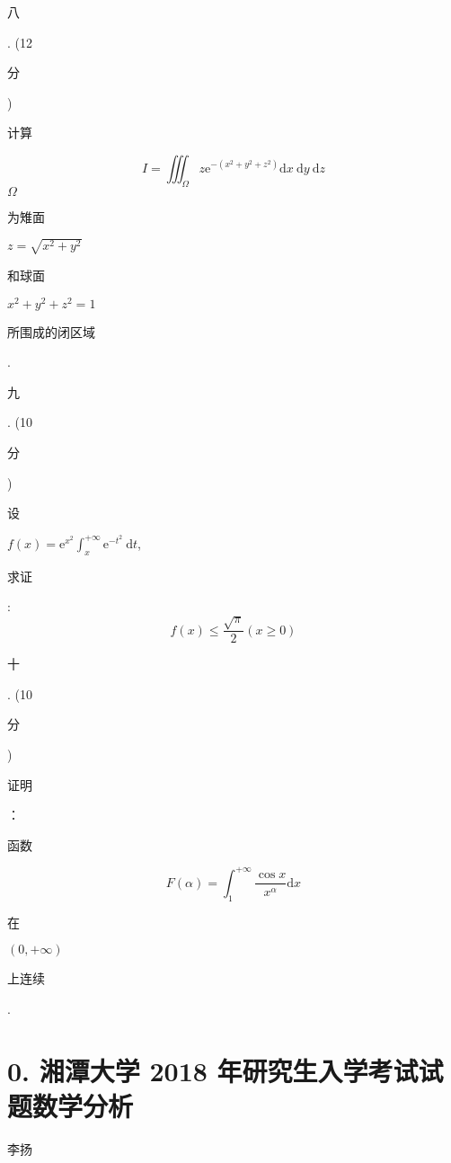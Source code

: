 \documentclass[10pt]{article}
\begin{document}
\begin{CJK}{UTF8}{mj}八\end{CJK}. (12 \begin{CJK}{UTF8}{mj}分\end{CJK}) \begin{CJK}{UTF8}{mj}计算\end{CJK}
$$
I=\iiint_{\Omega} z \mathrm{e}^{-\left(x^{2}+y^{2}+z^{2}\right)} \mathrm{d} x \mathrm{~d} y \mathrm{~d} z
$$
$\Omega$ \begin{CJK}{UTF8}{mj}为雉面\end{CJK} $z=\sqrt{x^{2}+y^{2}}$ \begin{CJK}{UTF8}{mj}和球面\end{CJK} $x^{2}+y^{2}+z^{2}=1$ \begin{CJK}{UTF8}{mj}所围成的闭区域\end{CJK}. \begin{CJK}{UTF8}{mj}九\end{CJK}. (10 \begin{CJK}{UTF8}{mj}分\end{CJK}) \begin{CJK}{UTF8}{mj}设\end{CJK} $f(x)=\mathrm{e}^{x^{2}} \int_{x}^{+\infty} \mathrm{e}^{-t^{2}} \mathrm{~d} t$, \begin{CJK}{UTF8}{mj}求证\end{CJK}:
$$
f(x) \leqslant \frac{\sqrt{\pi}}{2}(x \geqslant 0)
$$
\begin{CJK}{UTF8}{mj}十\end{CJK}. (10 \begin{CJK}{UTF8}{mj}分\end{CJK}) \begin{CJK}{UTF8}{mj}证明\end{CJK}：\begin{CJK}{UTF8}{mj}函数\end{CJK}
$$
F(\alpha)=\int_{1}^{+\infty} \frac{\cos x}{x^{\alpha}} \mathrm{d} x
$$
\begin{CJK}{UTF8}{mj}在\end{CJK} $(0,+\infty)$ \begin{CJK}{UTF8}{mj}上连续\end{CJK}.

\section{0. 湘潭大学 2018 年研究生入学考试试题数学分析}
\begin{CJK}{UTF8}{mj}李扬\end{CJK}
\end{document}
